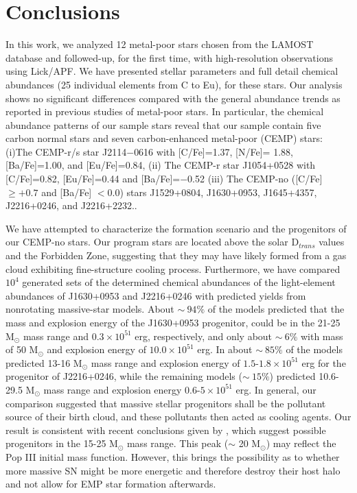 \chapter{Conclusions}\label{chap:introduction}

In this work, we analyzed 12 metal-poor stars chosen from the LAMOST database
and followed-up, for the first time, with high-resolution observations using
Lick/APF.  We have presented stellar parameters and full detail chemical
abundances (25 individual elements from C to Eu), for these stars. Our analysis
shows no significant differences compared with the general abundance trends as
reported in previous studies of metal-poor stars. In particular, the chemical abundance patterns of our sample stars reveal that our sample contain five carbon normal stars and seven carbon-enhanced metal-poor (CEMP) stars: (i)The CEMP-r/s star J2114$-$0616 with [C/Fe]=1.37,  [N/Fe]= 1.88, [Ba/Fe]=1.00, and [Eu/Fe]=0.84, (ii) The CEMP-r star J1054+0528 with [C/Fe]=0.82, [Eu/Fe]=0.44 and [Ba/Fe]=$-$0.52 (iii) The CEMP-no ([C/Fe] $\geqslant +0.7$ and [Ba/Fe] $< 0.0$) stars J1529+0804, J1630+0953, J1645+4357, J2216+0246, and J2216+2232.. 

We have attempted to characterize the formation scenario and the progenitors of
our CEMP-no stars. Our program stars are located above the solar D$_{trans}$
values and the Forbidden Zone, suggesting that they may have likely formed from
a gas cloud exhibiting fine-structure cooling process. Furthermore, we have
compared $10^{4}$ generated sets of the determined chemical abundances of the
light-element abundances of J1630+0953 and J2216+0246 with predicted yields from
nonrotating massive-star models. About $\sim ~94\%$ of the models predicted that
the mass and explosion energy of the J1630+0953 progenitor, could be in the
21-25 M$_{\odot}$ mass range and $0.3 \times 10^{51}$ erg, respectively, and
only about $\sim ~6\%$ with mass of 50 M$_{\odot}$ and explosion energy of $10.0
\times 10^{51}$ erg.  In about $\sim ~85\%$ of the models predicted 13-16
M$_{\odot}$ mass range and explosion energy  of $1.5$-$1.8 \times 10^{51}$ erg
for the progenitor of J2216+0246, while the remaining models ($\sim ~15\%$)
predicted 10.6-29.5 M$_{\odot}$ mass range and explosion energy $0.6$-$5
\times 10^{51}$ erg. In general, our comparison suggested that massive
stellar progenitors shall be the pollutant source of their birth cloud, and
these pollutants then acted as cooling agents. Our result is consistent with
recent conclusions given by \citet{2018ApJ...857...46I}, which suggest
possible progenitors in the 15-25 M$_{\odot}$ mass range. This peak
($\sim$ 20 M$_{\odot}$) may reflect the Pop III initial mass function.
However, this brings the possibility as to whether more massive SN might be
more energetic and therefore destroy their host halo and not allow for EMP
star formation afterwards.

